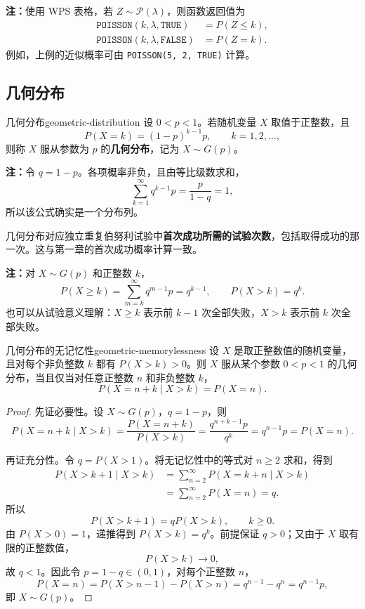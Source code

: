 \textbf{注：}\quad 使用 WPS 表格，若 $Z\sim\mathcal P(\lambda)$，则函数返回值为
\[
\begin{aligned}
\texttt{POISSON}(k,\lambda,\texttt{TRUE})&=P(Z\leq k),\\
\texttt{POISSON}(k,\lambda,\texttt{FALSE})&=P(Z=k).
\end{aligned}
\]
例如，上例的近似概率可由 \texttt{POISSON(5, 2, TRUE)} 计算。

\subsection*{几何分布}

\begin{mydefinition}{几何分布}{geometric-distribution}
设 $0<p<1$。若随机变量 $X$ 取值于正整数，且
\[
P(X=k)=(1-p)^{k-1}p,\qquad k=1,2,\ldots,
\]
则称 $X$ 服从参数为 $p$ 的\textbf{几何分布}，记为 $X\sim G(p)$。
\end{mydefinition}

\textbf{注：}\quad 令 $q=1-p$。各项概率非负，且由等比级数求和，
\[
\sum_{k=1}^{\infty}q^{k-1}p=\frac{p}{1-q}=1,
\]
所以该公式确实是一个分布列。

几何分布对应独立重复伯努利试验中\textbf{首次成功所需的试验次数}，包括取得成功的那一次。这与第一章的首次成功概率计算一致。

\textbf{注：}\quad 对 $X\sim G(p)$ 和正整数 $k$，
\[
P(X\geq k)=\sum_{m=k}^{\infty}q^{m-1}p=q^{k-1},
\qquad
P(X>k)=q^k.
\]
也可以从试验意义理解：$X\geq k$ 表示前 $k-1$ 次全部失败，$X>k$ 表示前 $k$ 次全部失败。

\begin{mytheorem}{几何分布的无记忆性}{geometric-memorylessness}
设 $X$ 是取正整数值的随机变量，且对每个非负整数 $k$ 都有 $P(X>k)>0$。则 $X$ 服从某个参数 $0<p<1$ 的几何分布，当且仅当对任意正整数 $n$ 和非负整数 $k$，
\[
P(X=n+k\mid X>k)=P(X=n).
\]
\end{mytheorem}

\begin{proof}
先证必要性。设 $X\sim G(p)$，$q=1-p$，则
\[
P(X=n+k\mid X>k)
=\frac{P(X=n+k)}{P(X>k)}
=\frac{q^{n+k-1}p}{q^k}
=q^{n-1}p=P(X=n).
\]

再证充分性。令 $q=P(X>1)$。将无记忆性中的等式对 $n\geq2$ 求和，得到
\[
\begin{aligned}
P(X>k+1\mid X>k)
&=\sum_{n=2}^{\infty}P(X=k+n\mid X>k)\\
&=\sum_{n=2}^{\infty}P(X=n)=q.
\end{aligned}
\]
所以
\[
P(X>k+1)=qP(X>k),\qquad k\geq0.
\]
由 $P(X>0)=1$，递推得到 $P(X>k)=q^k$。前提保证 $q>0$；又由于 $X$ 取有限的正整数值，
\[
P(X>k)\longrightarrow0,
\]
故 $q<1$。因此令 $p=1-q\in(0,1)$，对每个正整数 $n$，
\[
P(X=n)=P(X>n-1)-P(X>n)
=q^{n-1}-q^n=q^{n-1}p,
\]
即 $X\sim G(p)$。
\end{proof}

